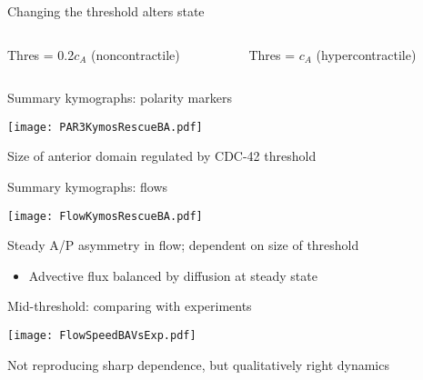 \documentclass{beamer}
\newcommand{\6}[1]{#1_{\text{6}}}
\newcommand{\3}[1]{#1_{\text{3}}}
\begin{document}
\begin{frame}{Changing the threshold alters state}
\begin{columns}
\begin{column}{0.5\textwidth}
\begin{center}
Thres = 0.2$c_A$ (noncontractile)

\end{center}
\end{column}
\begin{column}{0.5\textwidth}

\begin{center}
Thres = $c_A$ (hypercontractile)

\end{center}
\end{column}
\end{columns}
\end{frame}

\begin{frame}{Summary kymographs: polarity markers}
\begin{center}
\texttt{[image: PAR3KymosRescueBA.pdf]}
\end{center}
\vspace{0.5 cm}
Size of anterior domain regulated by CDC-42 threshold
\end{frame}

\begin{frame}{Summary kymographs: flows}
\begin{center}
\texttt{[image: FlowKymosRescueBA.pdf]}
\end{center}
\vspace{0.5 cm}
Steady A/P asymmetry in flow; dependent on size of threshold
\begin{itemize}
\item Advective flux balanced by diffusion at steady state
\end{itemize}
\end{frame}



\begin{frame}{Mid-threshold: comparing with experiments}
\begin{center}
\texttt{[image: FlowSpeedBAVsExp.pdf]}
\end{center}
Not reproducing sharp dependence, but qualitatively right dynamics
\end{frame}
\end{document}
